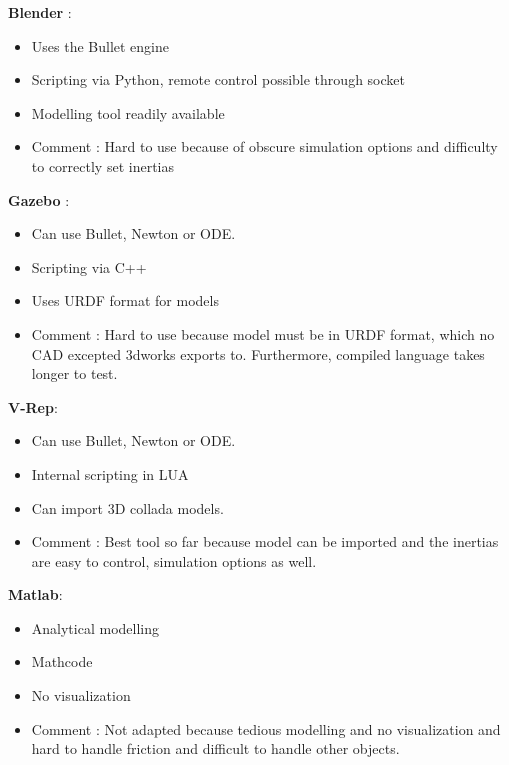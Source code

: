 \textbf{Blender\cite{blender_for_robotics}
} : \begin{itemize}
\item Uses the Bullet engine
\item Scripting via Python, remote control possible through socket
\item Modelling tool readily available
\item Comment : Hard to use because of obscure simulation options and difficulty to correctly set inertias
\end{itemize}

\textbf{Gazebo} : \begin{itemize}
\item Can use Bullet, Newton or ODE.
\item Scripting via C++
\item Uses URDF format for models
\item Comment : Hard to use because model must be in URDF format, which no CAD excepted 3dworks exports to. Furthermore, compiled language takes longer to test.
\end{itemize}

\textbf{V-Rep}: \begin{itemize}
\item Can use Bullet, Newton or ODE.
\item Internal scripting in LUA
\item Can import 3D collada models.
\item Comment : Best tool so far because model can be imported and the inertias are easy to control, simulation options as well.
\end{itemize}

\textbf{Matlab}: \begin{itemize}
\item Analytical modelling
\item Mathcode
\item No visualization
\item Comment : Not adapted because tedious modelling and no visualization and hard to handle friction and difficult to handle other objects.
\end{itemize}

